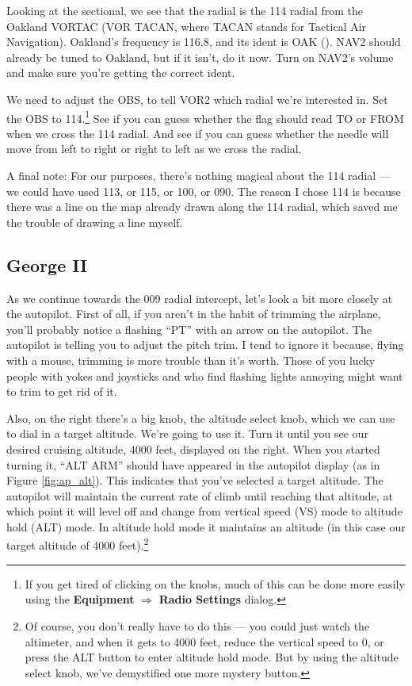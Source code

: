 Looking at the sectional, we see that the radial is the 114 radial
from the Oakland VORTAC (VOR TACAN, where TACAN stands for Tactical
Air Navigation).  Oakland's frequency is 116.8, and its ident is OAK
(\mdash\mdash\mdash\mspace \mdot\mdash\mspace \mdash\mdot\mdash).
NAV2 should already be tuned to Oakland, but if it isn't, do it
now. Turn on NAV2's
volume and make sure you're getting the correct ident.


We need to adjust the OBS, to tell VOR2 which radial we're interested
in.  Set the OBS to 114.\footnote{If you get tired of clicking on the knobs, much of
  this can be done more easily using the \textbf{\textsf{Equipment}}
  $\Rightarrow$ \textbf{\textsf{Radio Settings}} dialog.} See if you
can guess whether the flag should read TO or FROM when we cross the
114 radial.  And see if you can guess whether the needle will move
from left to right or right to left as we cross the radial.

A final note: For our purposes, there's nothing magical about the 114
radial --- we could have used 113, or 115, or 100, or 090.  The reason
I chose 114 is because there was a line on the map already drawn along
the 114 radial, which saved me the trouble of drawing a line myself.

\subsection{George II}

As we continue towards the 009 radial intercept, let's look a bit more
closely at the autopilot.  First of all, if you aren't in the habit of
trimming the airplane, you'll probably notice a flashing ``PT'' with
an arrow on the autopilot.  The autopilot is telling you to adjust the
pitch trim.  I tend to ignore it because, flying with a mouse,
trimming is more trouble than it's worth.  Those of you lucky people
with yokes and joysticks and who find flashing lights annoying might
want to trim to get rid of it.

Also, on the right there's a big knob, the altitude select knob, which
we can use to dial in a target altitude.  We're going to use it.  Turn
it until you see our desired cruising altitude, 4000 feet, displayed
on the right.  When you started turning it, ``ALT ARM'' should have
appeared in the autopilot display (as in Figure \ref{fig:ap_alt}).
This indicates that you've selected a target
altitude.  The
autopilot will maintain the current rate of climb until reaching that
altitude, at which point it will level off and change from vertical
speed (VS) mode to altitude hold (ALT) mode.  In altitude hold mode it
maintains an altitude (in this case our target altitude of 4000
feet).\footnote{ Of course, you don't really have to do this --- you
  could just watch the altimeter, and when it gets to 4000 feet,
  reduce the vertical speed to 0, or press the ALT button to enter
  altitude hold mode.  But by using the altitude select knob, we've
  demystified one more mystery button.}

